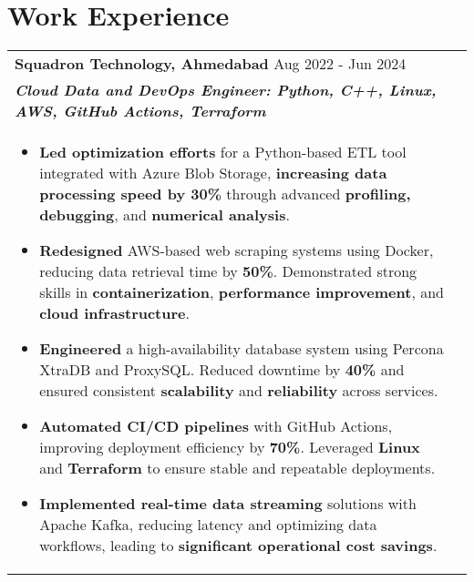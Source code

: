 \documentclass[a4paper,10pt]{article}
\begin{document}
\section{Work Experience}

\begin{tabularx}{\linewidth}{@{}l r@{}}
\textbf{Squadron Technology, Ahmedabad} \hfill \color[HTML]{371e77} Aug 2022 - Jun 2024 \\[1pt]
\color[HTML]{371e77}\textbf{\textit{Cloud Data and DevOps Engineer: Python, C++, Linux, AWS, GitHub Actions, Terraform}} \\[1pt]
\begin{minipage}[t]{\linewidth}
\begin{itemize}[nosep, after=\strut, leftmargin=2em, itemsep=2pt]
    \item \textbf{Led optimization efforts} for a Python-based ETL tool integrated with Azure Blob Storage, \textbf{increasing data processing speed by 30\%} through advanced \textbf{profiling, debugging}, and \textbf{numerical analysis}.
    \item \textbf{Redesigned} AWS-based web scraping systems using Docker, reducing data retrieval time by \textbf{50\%}. Demonstrated strong skills in \textbf{containerization}, \textbf{performance improvement}, and \textbf{cloud infrastructure}.
    \item \textbf{Engineered} a high-availability database system using Percona XtraDB and ProxySQL. Reduced downtime by \textbf{40\%} and ensured consistent \textbf{scalability} and \textbf{reliability} across services.
    \item \textbf{Automated CI/CD pipelines} with GitHub Actions, improving deployment efficiency by \textbf{70\%}. Leveraged \textbf{Linux} and \textbf{Terraform} to ensure stable and repeatable deployments.
    \item \textbf{Implemented real-time data streaming} solutions with Apache Kafka, reducing latency and optimizing data workflows, leading to \textbf{significant operational cost savings}.
\end{itemize}
\end{minipage}
\end{tabularx}
\end{document}
